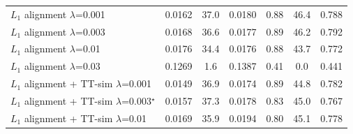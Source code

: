 \begin{tabular}{l cc cccc}
$L_1$ alignment $\lambda$=0.001 & 0.0162 & 37.0 & 0.0180 & 0.88 & 46.4 & 0.788 \\
$L_1$ alignment $\lambda$=0.003 & 0.0168 & 36.6 & 0.0177 & 0.89 & 46.2 & 0.792 \\
$L_1$ alignment $\lambda$=0.01 & 0.0176 & 34.4 & 0.0176 & 0.88 & 43.7 & 0.772 \\
$L_1$ alignment $\lambda$=0.03 & 0.1269 & 1.6 & 0.1387 & 0.41 & 0.0 & 0.441 \\
\midrule
$L_1$ alignment + TT-sim $\lambda$=0.001 & 0.0149 & 36.9 & 0.0174 & 0.89 & 44.8 & 0.782 \\
$L_1$ alignment + TT-sim $\lambda$=0.003$^\star$ & 0.0157 & 37.3 & 0.0178 & 0.83 & 45.0 & 0.767 \\
$L_1$ alignment + TT-sim $\lambda$=0.01 & 0.0169 & 35.9 & 0.0194 & 0.80 & 45.1 & 0.778 \\
\bottomrule
\end{tabular}
